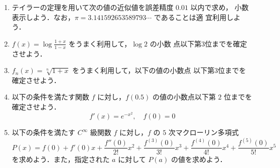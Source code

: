 \documentclass[11pt, uplatex, dvipdfmx, twoside]{jsarticle}
\newcommand{\ds}{\displaystyle}
\begin{document}
\begin{enumerate}[label=\arabic{section}.\arabic*]

  \setlength{\itemsep}{1zh}
  
\item テイラーの定理を用いて次の値の近似値を誤差精度 $0.01$ 以内で求め，
  小数表示しよう．なお，$\pi = 3.141592653589793\cdots$ であることは適
  宜利用しよう．

  \vspace{1ex}


\item $\ds f(x) = \log\frac{1+x}{1-x}$ をうまく利用して，$\log 2$ の小数
  点以下第3位までを確定させよう．

\item $f_n(x) = \sqrt[n]{1+x}$ をうまく利用して，以下の値の小数点
  以下第3位までを確定させよう．

  \vspace{1ex}


\item 以下の条件を満たす関数 $f$ に対し，$f(0.5)$ の値の小数点以下第 $2$
  位までを確定させよう．
  \[
    f'(x) = e^{-x^2}, \quad f(0)=0
  \]

\item 以下の条件を満たす $C^{\infty}$ 級関数 $f$ に対し，$f$ の $5$ 次マクローリン多項式
  \[
    P(x) = f(0) + f'(0)x + \frac{f''(0)}{2!}x^2 +
    \frac{f^{(3)}(0)}{3!}x^3 + \frac{f^{(4)}(0)}{4!}x^4 + \frac{f^{(5)}(0)}{5!}x^5
  \]
  を求めよう．また，指定された $a$ に対して $P(a)$ の値を求めよう．
  

\end{enumerate}
\end{document}

